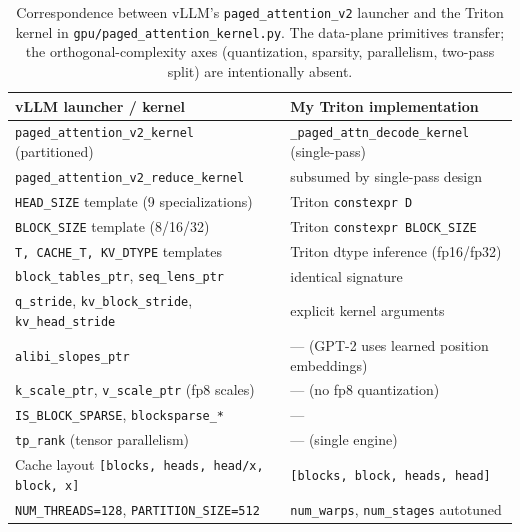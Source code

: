 \documentclass{article}
\begin{document}
\begin{table}[t]
  \caption{Correspondence between vLLM's \texttt{paged\_attention\_v2} launcher and the Triton kernel in \texttt{gpu/paged\_attention\_kernel.py}. The data-plane primitives transfer; the orthogonal-complexity axes (quantization, sparsity, parallelism, two-pass split) are intentionally absent.}
  \label{tab:correspondence}
  \centering
  \small
  \begin{tabular}{ll}
    \toprule
    vLLM launcher / kernel & My Triton implementation \\
    \midrule
    \texttt{paged\_attention\_v2\_kernel} (partitioned)            & \texttt{\_paged\_attn\_decode\_kernel} (single-pass) \\
    \texttt{paged\_attention\_v2\_reduce\_kernel}                  & subsumed by single-pass design \\
    \texttt{HEAD\_SIZE} template (9 specializations)               & Triton \texttt{constexpr D} \\
    \texttt{BLOCK\_SIZE} template (8/16/32)                        & Triton \texttt{constexpr BLOCK\_SIZE} \\
    \texttt{T, CACHE\_T, KV\_DTYPE} templates                      & Triton dtype inference (fp16/fp32) \\
    \texttt{block\_tables\_ptr}, \texttt{seq\_lens\_ptr}           & identical signature \\
    \texttt{q\_stride}, \texttt{kv\_block\_stride}, \texttt{kv\_head\_stride} & explicit kernel arguments \\
    \texttt{alibi\_slopes\_ptr}                                    & --- (GPT-2 uses learned position embeddings) \\
    \texttt{k\_scale\_ptr}, \texttt{v\_scale\_ptr} (fp8 scales)    & --- (no fp8 quantization) \\
    \texttt{IS\_BLOCK\_SPARSE}, \texttt{blocksparse\_*}            & --- \\
    \texttt{tp\_rank} (tensor parallelism)                         & --- (single engine) \\
    Cache layout \texttt{[blocks, heads, head/x, block, x]}        & \texttt{[blocks, block, heads, head]} \\
    \texttt{NUM\_THREADS=128}, \texttt{PARTITION\_SIZE=512}        & \texttt{num\_warps}, \texttt{num\_stages} autotuned \\
    \bottomrule
  \end{tabular}
\end{table}
\end{document}
